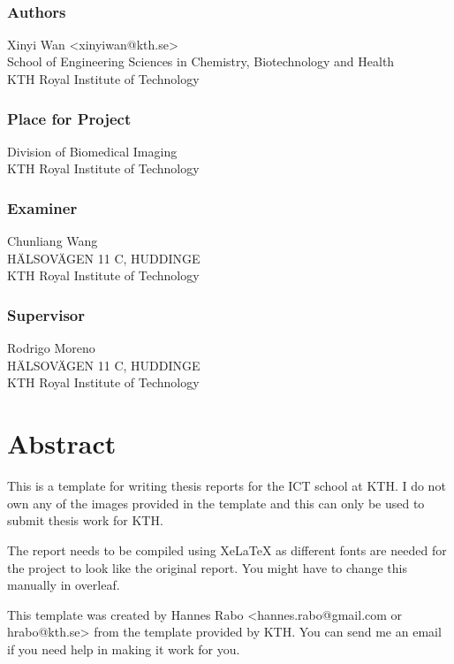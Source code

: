\newpage
\thispagestyle{plain}
~\\
\vfill
{ 
	\subsection*{Authors}
	Xinyi Wan <xinyiwan@kth.se>\\
	School of Engineering Sciences in Chemistry, Biotechnology and Health\\
	KTH Royal Institute of Technology
	
	\subsection*{Place for Project}
	Division of Biomedical Imaging\\
	KTH Royal Institute of Technology
	
	\subsection*{Examiner}
	Chunliang Wang\\
	HÄLSOVÄGEN 11 C, HUDDINGE \\
	KTH Royal Institute of Technology
	
	\subsection*{Supervisor}
	Rodrigo Moreno\\
	HÄLSOVÄGEN 11 C, HUDDINGE\\
	KTH Royal Institute of Technology
	~
}


\newpage
\thispagestyle{plain}
\chapter*{Abstract}

This is a template for writing thesis reports for the ICT school at KTH. I do not own any of the images provided in the template and this can only be used to submit thesis work for KTH.

The report needs to be compiled using XeLaTeX as different fonts are needed for the project to look like the original report. You might have to change this manually in overleaf.

This template was created by Hannes Rabo <hannes.rabo@gmail.com or hrabo@kth.se> from the template provided by KTH. You can send me an email if you need help in making it work for you.


